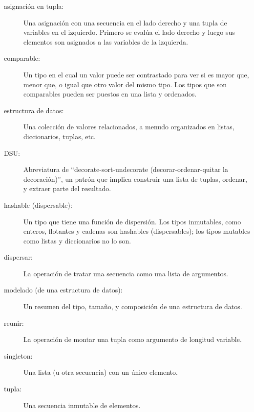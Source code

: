 \begin{description}

\item[asignación en tupla:] Una asignación con una secuencia en el
lado derecho y una tupla de variables en el izquierdo. Primero
se evalúa el lado derecho y luego sus elementos son asignados a las
variables de la izquierda.

\item[comparable:] Un tipo en el cual un valor puede ser contrastado para ver si es
mayor que, menor que, o igual que otro valor del mismo tipo.
Los tipos que son comparables pueden ser puestos en una lista y ordenados.

\item[estructura de datos:] Una colección de valores relacionados, a menudo
organizados en listas, diccionarios, tuplas, etc.

\item[DSU:] Abreviatura de ``decorate-sort-undecorate
(decorar-ordenar-quitar la decoración)'',
un patrón que implica construir una lista de tuplas, ordenar, y
extraer parte del resultado.

\item[hashable (dispersable):] Un tipo que tiene una función de dispersión. Los tipos
inmutables, como enteros,
flotantes y cadenas son hashables (dispersables); los tipos mutables como listas y
diccionarios no lo son.

\item[dispersar:] La operación de tratar una secuencia como una lista de
argumentos.

\item[modelado (de una estructura de datos):] Un resumen del tipo,
tamaño, y composición de una estructura de datos.

\item[reunir:] La operación de montar una tupla
como argumento de longitud variable.

\item[singleton:] Una lista (u otra secuencia) con un único elemento.

\item[tupla:] Una secuencia inmutable de elementos.

\end{description}



